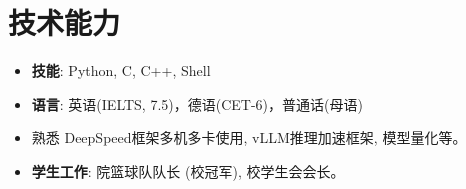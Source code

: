 \documentclass{cls/resume}
\begin{document}
\section{技术能力}
\begin{itemize}[parsep=0.2ex]
    \item \textbf{技能}: Python, C, C++, Shell
    \item \textbf{语言}: 英语(IELTS, 7.5)，德语(CET-6)，普通话(母语)
    \item 熟悉 DeepSpeed框架多机多卡使用, vLLM推理加速框架, 模型量化等。
    \item \textbf{学生工作}: 院篮球队队长 (校冠军), 校学生会会长。
\end{itemize}
\end{document}
